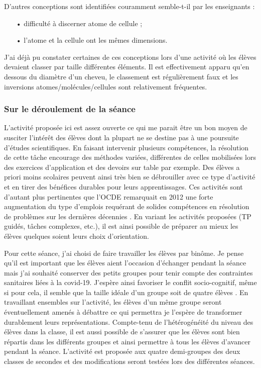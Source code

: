 \documentclass[12pt,a4paper, fleqn]{report}
\begin{document}
D'autres conceptions sont identifiées couramment semble-t-il par les enseignants :
\begin{itemize}
\item[•] difficulté à discerner atome de cellule ;
\item[•] l'atome et la cellule ont les mêmes dimensions.
\end{itemize}

J'ai déjà pu constater certaines de ces conceptions lors d'une activité où les élèves devaient classer par taille différentes éléments.
Il est effectivement apparu qu'en dessous du diamètre d'un cheveu, le classement est régulièrement faux et les inversions atomes/molécules/cellules sont relativement fréquentes.

\subsubsection{Sur le déroulement de la séance}

L'activité proposée ici est assez ouverte ce qui me parait être un bon moyen de susciter l'intérêt des élèves dont la plupart ne se destine pas à une poursuite d'études scientifiques.
En faisant intervenir plusieurs compétences, la résolution de cette tâche encourage des méthodes variées, différentes de celles mobilisées lors des exercices d'application et des devoirs sur table par exemple.
Des élèves a priori moins scolaires peuvent ainsi très bien se débrouiller avec ce type d'activité et en tirer des bénéfices durables pour leurs apprentissages.
Ces activités sont d'autant plus pertinentes que l'OCDE remarquait en 2012 \og une forte  augmentation du type d'emplois requérant de solides compétences en résolution de problèmes \fg{} sur les dernières décennies \cite{OCDE2012}.
En variant les activités proposées (TP guidés, tâches complexes, etc.), il est ainsi possible de préparer au mieux les élèves quelques soient leurs choix d'orientation.

Pour cette séance, j'ai choisi de faire travailler les élèves par binôme.
Je pense qu'il est important que les élèves aient l'occasion d'échanger pendant la séance mais j'ai souhaité conserver des petits groupes pour tenir compte des contraintes sanitaires liées à la covid-19.
J'espère ainsi favoriser le conflit socio-cognitif, même si pour cela, il semble que la taille idéale d'un groupe soit de quatre élèves \cite{Courtillot2006}.
En travaillant ensembles sur l'activité, les élèves d'un même groupe seront éventuellement amenés à débattre ce qui permettra je l'espère de transformer durablement leurs représentations.
Compte-tenu de l'hétérogénéité du niveau des élèves dans la classe, il est aussi possible de s'assurer que les élèves sont bien répartis dans les différents groupes et ainsi permettre à tous les élèves d'avancer pendant la séance.
L'activité est proposée aux quatre demi-groupes des deux classes de secondes et des modifications seront testées lors des différentes séances.
\end{document}
